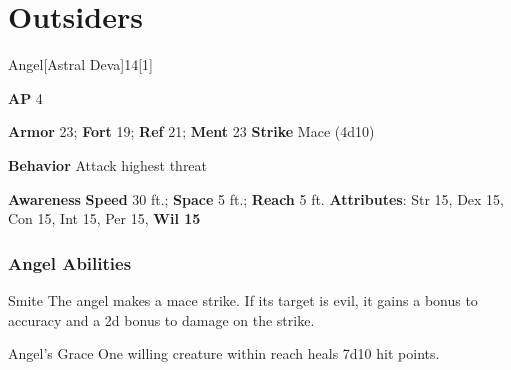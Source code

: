 \section{Outsiders}
\begin{monsection}{Angel}[Astral Deva]{14}[1]
\vspace{-1em}\vspace{-1em}
\begin{spellcontent}
\begin{spelltargetinginfo}
{\textbf{AP} 4}

\pari \textbf{Armor} 23;
\textbf{Fort} 19;
\textbf{Ref} 21;
\textbf{Ment} 23
\pari \textbf{Strike} Mace  (4d10)



\pari \textbf{Behavior} Attack highest threat
\end{spelltargetinginfo}
\end{spellcontent}

\begin{monsterfooter}
\pari \textbf{Awareness} 
\pari \textbf{Speed} 30 ft.;
\textbf{Space} 5 ft.;
\textbf{Reach} 5 ft.
\pari \textbf{Attributes}:
Str 15,
Dex 15,
Con 15,
Int 15,
Per 15,
\textbf{Wil 15}
\end{monsterfooter}
\end{monsection}


\subsubsection{Angel Abilities}

\begin{freeability}{Smite}
The angel makes a mace strike.
If its target is evil, it gains a  bonus to accuracy and a \plus2d bonus to damage on the strike.
\end{freeability}

\vspace{0.5em}
\begin{freeability}{Angel's Grace}
One willing creature within reach heals 7d10 hit points.
\end{freeability}

